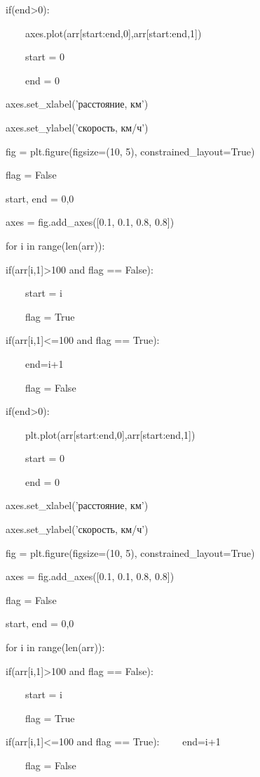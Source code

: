 \documentclass[A4paper,12pt]{article}
\theoremstyle{plain} %
\theoremstyle{definition} %
\theoremstyle{remark} %
\begin{document}
    if(end>0):
    
    \ \ \ \ axes.plot(arr[start:end,0],arr[start:end,1])
        
    \ \ \ \ start = 0
        
    \ \ \ \ end = 0

\noindent axes.set\_xlabel('расстояние, км')

\noindent axes.set\_ylabel('скорость, км/ч')

\noindent fig = plt.figure(figsize=(10, 5), constrained\_layout=True)

\noindent flag = False

\noindent start, end = 0,0

\noindent axes = fig.add\_axes([0.1, 0.1, 0.8, 0.8])

\noindent for i in range(len(arr)):

    if(arr[i,1]>100 and flag == False):
    
    \ \ \ \ start = i
        
    \ \ \ \ flag = True
        
    if(arr[i,1]<=100 and flag == True):
    
    \ \ \ \ end=i+1
        
    \ \ \ \ flag = False
        
    if(end>0):
    
    \ \ \ \ plt.plot(arr[start:end,0],arr[start:end,1])
        
    \ \ \ \ start = 0
        
    \ \ \ \ end = 0
        
\noindent axes.set\_xlabel('расстояние, км')

\noindent axes.set\_ylabel('скорость, км/ч')

\noindent fig = plt.figure(figsize=(10, 5), constrained\_layout=True)

\noindent axes = fig.add\_axes([0.1, 0.1, 0.8, 0.8])

\noindent flag = False

\noindent start, end = 0,0

\noindent for i in range(len(arr)):

    if(arr[i,1]>100 and flag == False):
    
    \ \ \ \ start = i
    
    \ \ \ \ flag = True
    
    if(arr[i,1]<=100 and flag == True):
    \ \ \ \ end=i+1
    
    \ \ \ \ flag = False
    
\end{document}

